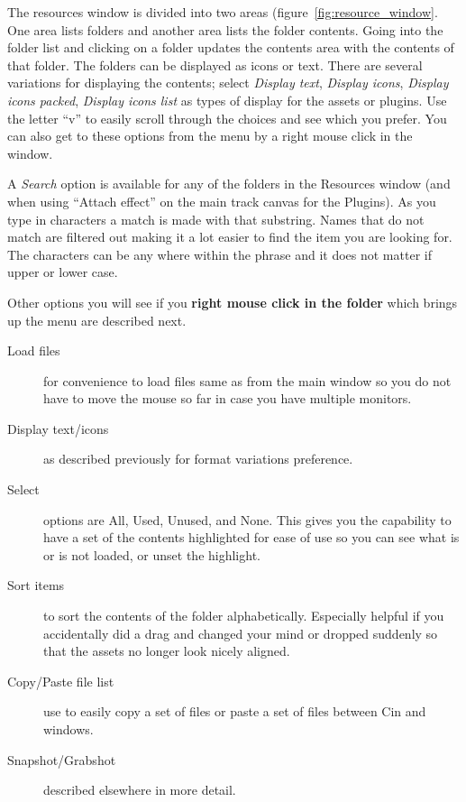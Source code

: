 The resources window is divided into two areas (figure~\ref{fig:resource_window}. 
One area lists folders and another area lists the folder contents. 
Going into the folder list and clicking on a folder updates the contents area with the contents of that folder. 
The folders can be displayed as icons or text. 
There are several variations for displaying the contents; select \emph{Display text}, \emph{Display icons}, \emph{Display icons packed}, \emph{Display icons list} as types of display for the assets or plugins. 
Use the letter “v” to easily scroll through the choices and see which you prefer.  
You can also get to these options from the menu by a right mouse click in the window.

A \emph{Search} option is available for any of the folders in the Resources window (and when using “Attach effect” on the main track canvas for the Plugins).  
As you type in characters a match is made with that substring.  
Names that do not match are filtered out making it a lot easier to find the item you are looking for.  
The characters can be any where within the phrase and it does not matter if upper or lower case. 

Other options you will see if you \textbf{right mouse click in the folder} which brings up the menu are described next.  

\begin{description}
    \item[ Load files ]  for convenience to load files same as from the main window so you do not have to move the mouse so far in case you have multiple monitors.
    \item[Display text/icons]  as described previously for format variations preference.
    \item[Select]  options are All, Used, Unused, and None.  This gives you the capability to have a set of the
        contents highlighted for ease of use so you can see what is or is not loaded, or unset the highlight.
    \item[Sort items]  to sort the contents of the folder alphabetically.  Especially helpful if you accidentally did a 
        drag and changed your mind or dropped suddenly so that the assets no longer look nicely aligned.
    \item[Copy/Paste file list]  use to easily copy a set of files or paste a set of files between Cin and windows.
    \item[Snapshot/Grabshot]  described elsewhere in more detail.
\end{description}

